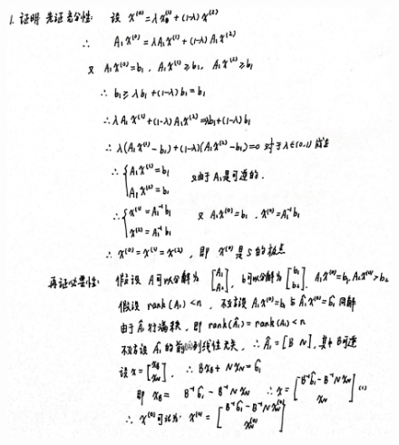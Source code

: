 \documentclass[a4paper]{article}
\begin{document}
\begin{figure}[htbp]
	\centering
	\includegraphics[height=18cm]{img_0331.jpg}
\end{figure}
\end{document}
